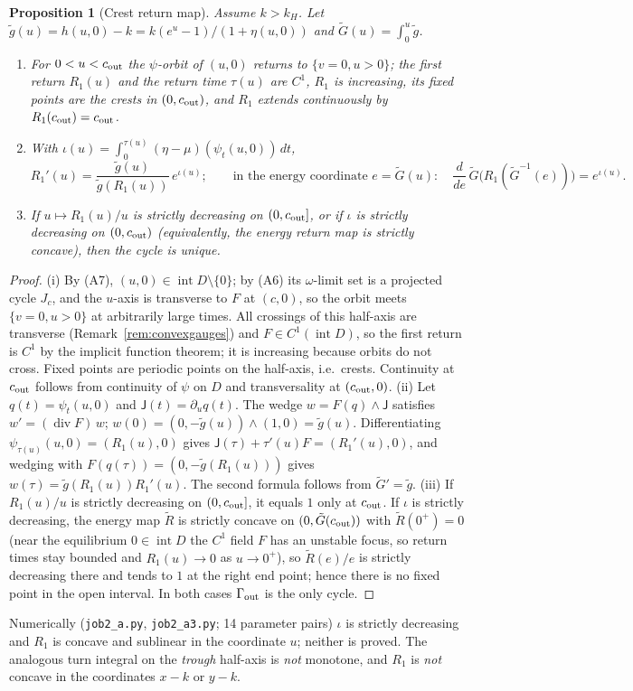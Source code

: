 \documentclass[11pt,a4paper]{article}
\numberwithin{equation}{section}
\newtheorem{proposition}[theorem]{Proposition}
\theoremstyle{remark}\newtheorem{remark}[theorem]{Remark}
\DeclareMathOperator{\inter}{int}
\DeclareMathOperator{\diver}{div}
\begin{document}
\begin{proposition}[Crest return map]\label{prop:return}
Assume $k>k_H$. Let $\tilde g(u)=h(u,0)-k=k(e^{u}-1)/(1+\eta(u,0))$ and $\tilde G(u)=\int_0^u\tilde g$.
\begin{enumerate}[label=\textup{(\roman*)}]
\item For $0<u<c_{\rm out}$ the $\psi$-orbit of $(u,0)$ returns to $\{v=0,u>0\}$; the first return $R_1(u)$ and the
return time $\tau(u)$ are $C^1$, $R_1$ is increasing, its fixed points are the crests in $(0,c_{\rm out})$, and $R_1$
extends continuously by $R_1(c_{\rm out})=c_{\rm out}$.
\item With $\iota(u)=\int_0^{\tau(u)}(\eta-\mu)(\psi_t(u,0))\,dt$,
\[
R_1'(u)=\frac{\tilde g(u)}{\tilde g(R_1(u))}\,e^{\iota(u)};\qquad\text{in the energy coordinate }e=\tilde G(u):\quad
\frac{d}{de}\,\tilde G\bigl(R_1(\tilde G^{-1}(e))\bigr)=e^{\iota(u)}.
\]
\item If $u\mapsto R_1(u)/u$ is strictly decreasing on $(0,c_{\rm out}]$, or if $\iota$ is strictly decreasing on
$(0,c_{\rm out})$ (equivalently, the energy return map is strictly concave), then the cycle is unique.
\end{enumerate}
\end{proposition}
\begin{proof}
(i) By (A7), $(u,0)\in\inter D\setminus\{0\}$; by (A6) its $\omega$-limit set is a projected cycle $J_c$, and the
$u$-axis is transverse to $F$ at $(c,0)$, so the orbit meets $\{v=0,u>0\}$ at arbitrarily large times. All crossings
of this half-axis are transverse (Remark~\ref{rem:convexgauges}) and $F\in C^1(\inter D)$, so the first return is
$C^1$ by the implicit function theorem; it is increasing because orbits do not cross. Fixed points are periodic
points on the half-axis, i.e.\ crests. Continuity at $c_{\rm out}$ follows from continuity of $\psi$ on $D$ and
transversality at $(c_{\rm out},0)$.
(ii) Let $q(t)=\psi_t(u,0)$ and $\mathsf J(t)=\partial_uq(t)$. The wedge $w=F(q)\wedge\mathsf J$ satisfies
$w'=(\diver F)\,w$; $w(0)=(0,-\tilde g(u))\wedge(1,0)=\tilde g(u)$. Differentiating $\psi_{\tau(u)}(u,0)=(R_1(u),0)$
gives $\mathsf J(\tau)+\tau'(u)F=(R_1'(u),0)$, and wedging with $F(q(\tau))=(0,-\tilde g(R_1(u)))$ gives
$w(\tau)=\tilde g(R_1(u))R_1'(u)$. The second formula follows from $\tilde G'=\tilde g$.
(iii) If $R_1(u)/u$ is strictly decreasing on $(0,c_{\rm out}]$, it equals $1$ only at $c_{\rm out}$. If $\iota$ is
strictly decreasing, the energy map $\tilde R$ is strictly concave on $(0,\tilde G(c_{\rm out}))$ with
$\tilde R(0^+)=0$ (near the equilibrium $0\in\inter D$ the $C^1$ field $F$ has an unstable focus, so return times
stay bounded and $R_1(u)\to0$ as $u\to0^+$), so $\tilde R(e)/e$ is strictly decreasing there and tends to $1$ at the right end point; hence
there is no fixed point in the open interval. In both cases $\Gamma_{\rm out}$ is the only cycle.
\end{proof}
\noindent Numerically (\texttt{job2\_a.py}, \texttt{job2\_a3.py}; 14 parameter pairs) $\iota$ is strictly decreasing
and $R_1$ is concave and sublinear in the coordinate $u$; neither is proved. The analogous turn integral on the
\emph{trough} half-axis is \emph{not} monotone, and $R_1$ is \emph{not} concave in the coordinates $x-k$ or $y-k$.
\end{document}

